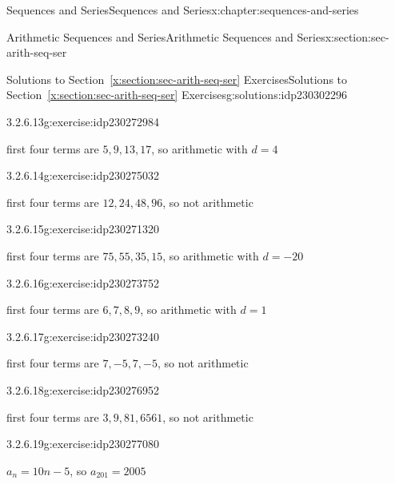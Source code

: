 \documentclass[twoside,10pt,]{book}
\newcommand{\xreffont}{\relax}
\numberwithin{equation}{section}
\begin{document}
\begin{chapterptx}{Sequences and Series}{}{Sequences and Series}{}{}{x:chapter:sequences-and-series}
\begin{sectionptx}{Arithmetic Sequences and Series}{}{Arithmetic Sequences and Series}{}{}{x:section:sec-arith-seq-ser}
\begin{solutions-subsection}{Solutions to Section~{\xreffont\ref*{x:section:sec-arith-seq-ser}} Exercises}{}{Solutions to Section~{\xreffont\ref*{x:section:sec-arith-seq-ser}} Exercises}{}{}{g:solutions:idp230302296}
\par\medskip\noindent
\begin{exercisegroup}
\begin{divisionsolutioneg}{3.2.6.13}{}{g:exercise:idp230272984}%
\par\smallskip%
\noindent\hypertarget{g:solution:idp230272600-main}{}first four terms are \(5, 9, 13, 17\), so arithmetic with \(d = 4\)\end{divisionsolutioneg}%
\begin{divisionsolutioneg}{3.2.6.14}{}{g:exercise:idp230275032}%
\par\smallskip%
\noindent\hypertarget{g:solution:idp230272344-main}{}first four terms are \(12, 24, 48, 96\), so not arithmetic\end{divisionsolutioneg}%
\begin{divisionsolutioneg}{3.2.6.15}{}{g:exercise:idp230271320}%
\par\smallskip%
\noindent\hypertarget{g:solution:idp230270936-main}{}first four terms are \(75, 55, 35, 15\), so arithmetic with \(d = -20\)\end{divisionsolutioneg}%
\begin{divisionsolutioneg}{3.2.6.16}{}{g:exercise:idp230273752}%
\par\smallskip%
\noindent\hypertarget{g:solution:idp230269912-main}{}first four terms are \(6, 7, 8, 9\), so arithmetic with \(d = 1\)\end{divisionsolutioneg}%
\begin{divisionsolutioneg}{3.2.6.17}{}{g:exercise:idp230273240}%
\par\smallskip%
\noindent\hypertarget{g:solution:idp230270424-main}{}first four terms are \(7, -5, 7, -5\), so not arithmetic\end{divisionsolutioneg}%
\begin{divisionsolutioneg}{3.2.6.18}{}{g:exercise:idp230276952}%
\par\smallskip%
\noindent\hypertarget{g:solution:idp230282584-main}{}first four terms are \(3, 9, 81, 6561\), so not arithmetic\end{divisionsolutioneg}%
\end{exercisegroup}
\par\medskip\noindent
\begin{divisionsolution}{3.2.6.19}{}{g:exercise:idp230277080}%
\par\smallskip%
\noindent\hypertarget{g:solution:idp230281432-main}{}\(a_n = 10n - 5\), so \(a_{201} = 2005\)\end{divisionsolution}%

\end{solutions-subsection}
\end{sectionptx}
\end{chapterptx}
\end{document}
